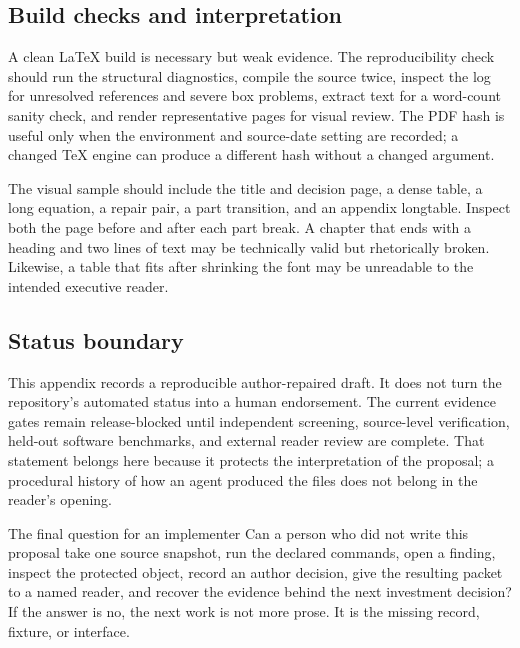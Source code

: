 \subsection{Build checks and interpretation}

A clean LaTeX build is necessary but weak evidence. The reproducibility check
should run the structural diagnostics, compile the source twice, inspect the
log for unresolved references and severe box problems, extract text for a
word-count sanity check, and render representative pages for visual review.
The PDF hash is useful only when the environment and source-date setting are
recorded; a changed TeX engine can produce a different hash without a changed
argument.

The visual sample should include the title and decision page, a dense table, a
long equation, a repair pair, a part transition, and an appendix longtable.
Inspect both the page before and after each part break. A chapter that ends
with a heading and two lines of text may be technically valid but rhetorically
broken. Likewise, a table that fits after shrinking the font may be unreadable
to the intended executive reader.

\subsection{Status boundary}

This appendix records a reproducible author-repaired draft. It does not turn
the repository's automated status into a human endorsement. The current
evidence gates remain release-blocked until independent screening,
source-level verification, held-out software benchmarks, and external reader
review are complete. That statement belongs here because it protects the
interpretation of the proposal; a procedural history of how an agent produced
the files does not belong in the reader's opening.

\begin{plainbox}{The final question for an implementer}
Can a person who did not write this proposal take one source snapshot, run the
declared commands, open a finding, inspect the protected object, record an
author decision, give the resulting packet to a named reader, and recover the
evidence behind the next investment decision? If the answer is no, the next
work is not more prose. It is the missing record, fixture, or interface.
\end{plainbox}
